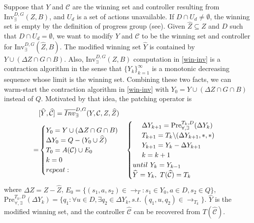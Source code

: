 Suppose that $ Y $ and $ \mathcal{C} $ are the winning set and controller resulting from $ \text{Inv}_{\exists}^{D,G}(Z,B) $, and $ U_d $ is a set of actions unavailable. If $ D\cap U_d \not= \emptyset$, the winning set is empty by the definition of progress group (see\cite{Nilsson2017}). Given $ \widehat{Z} \subseteq Z $ and $D$ such that $ D\cap U_d=\emptyset $, we want to modify $ Y $ and $ \mathcal{C} $ to be the winning set and controller for $ \text{Inv}_{\exists}^{D,G}(\widehat{Z}, B) $.  The modified winning set $\widehat{Y}$ is contained by $ Y\cup (\Delta Z\cap G\cap B) $. Also, $ \text{Inv}_{\exists}^{D,G}(Z,B) $ computation in \eqref{win-inv} is a contraction algorithm in the sense that $ \{Y_k\}_{k=1}^{\infty} $ is a monotonic decreasing sequence whose limit is the winning set. Combining these two facts, we can warm-start the contraction algorithm in \eqref{win-inv} with $ Y_0=Y\cup (\Delta Z\cap G\cap B)$ instead of $ Q $. Motivated by that idea, the patching operator is
{\small\begin{align}
&[\widehat{Y},\widehat{\mathcal{C}}]=\overline{Inv}_{\exists}^{D,G}(Y,\mathcal{C},Z,\widehat{Z})\nonumber \\
=&\begin{cases}
Y_0 = Y\cup (\Delta Z\cap G \cap B)\\
\Delta Y_0 = Q - (Y_0 \cup \widehat{Z})\\
T_0  = A(\mathcal{C})\cup E_0\\
{\color{black} k=0}\\
{\color{black} repeat:}\\
\end{cases}
\begin{cases}
\ \ \ \ \Delta Y_{k+1} = \text{Pre}_{\forall,\exists}^{T_k,D}(\Delta Y_k) \\
\ \ \ \ T_{k+1} = T_{k}\backslash (\Delta Y_{k+1},*,*)\\
\ \ \ \ Y_{k+1} = Y_k- \Delta Y_{k+1}\\
\ \ \ \ {\color{black} k=k+1}\\
{\color{black} until \ Y_k = Y_{k-1}}\\
\widehat{Y}=Y_k,\ T(\widehat{\mathcal{C}}) = T_{k}
\end{cases}\label{patch-inv}
\end{align}}
where $ \Delta Z = Z - \widehat{Z} $, $ E_0 = \{(s_1,a,s_2)\in \rightarrow_{T}: s_1\in Y_0, a\in D, s_2 \in Q\} $, $ \text{Pre}_{\forall,\exists}^{T_k,D}(\Delta Y_k) = \{q_1: \forall u\in D, \exists q_2\in \Delta Y_k, s.t.\ (q_1, u, q_2) \in \rightarrow_{T_k} \} $. $ \widehat{Y} $ is the modified winning set, and the controller $ \widehat{\mathcal{C}} $ can be recovered from $ T(\widehat{\mathcal{C}}) $.

